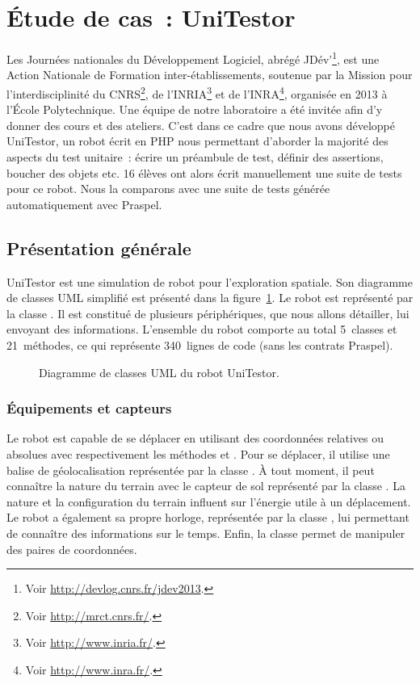 \section{Étude de cas~: UniTestor}
\label{section:experimentation:unitestor}

Les Journées nationales du Développement Logiciel, abrégé JDév'\footnote{Voir
\url{http://devlog.cnrs.fr/jdev2013}.}, est une Action Nationale de Formation
inter-établissements, soutenue par la Mission pour l'interdisciplinité du
CNRS\footnote{Voir \url{http://mrct.cnrs.fr/}.}, de l'INRIA\footnote{Voir
\url{http://www.inria.fr/}.} et de l'INRA\footnote{Voir
\url{http://www.inra.fr/}.}, organisée en 2013 à l'École Polytechnique. Une
équipe de notre laboratoire a été invitée afin d'y donner des cours et des
ateliers. C'est dans ce cadre que nous avons développé UniTestor, un robot écrit
en PHP nous permettant d'aborder la majorité des aspects du test unitaire~:
écrire un préambule de test, définir des assertions, boucher des objets etc. 16
élèves ont alors écrit manuellement une suite de tests pour ce robot. Nous la
comparons avec une suite de tests générée automatiquement avec Praspel.

\subsection{Présentation générale}

UniTestor est une simulation de robot pour l'exploration spatiale. Son diagramme
de classes UML simplifié est présenté dans la
figure~\ref{figure:experimentation:unitestor}. Le robot est représenté par la
classe . Il est constitué de plusieurs périphériques, que nous
allons détailler, lui envoyant des informations. L'ensemble du robot comporte au
total 5~classes et 21~méthodes, ce qui représente 340~lignes de code (sans les
contrats Praspel).
%
\begin{figure}


\caption{\label{figure:experimentation:unitestor} Diagramme de classes UML du
robot UniTestor.}

\end{figure}

\subsubsection{Équipements et capteurs}

Le robot est capable de se déplacer en utilisant des coordonnées relatives ou
absolues avec respectivement les méthodes  et . Pour se
déplacer, il utilise une balise de géolocalisation représentée par la classe
. À tout moment, il peut connaître la nature du terrain avec
le capteur de sol représenté par la classe . La nature et la
configuration du terrain influent sur l'énergie utile à un déplacement. Le robot
a également sa propre horloge, représentée par la classe , lui
permettant de connaître des informations sur le temps. Enfin, la classe
 permet de manipuler des paires de coordonnées.

